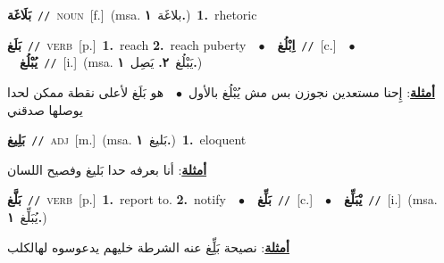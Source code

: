 \documentclass[10pt,a4paper,twoside]{article} %
\begin{document}
\begin{multicols}{2}
{\setlength\topsep{0pt}\textbf{\foreignlanguage{arabic}{بَلَاغَة}}\ {\color{gray}\texttt{//}\color{black}}\ \textsc{noun}\ [f.]\ \color{gray}(msa. \foreignlanguage{arabic}{بلاغَة}~\foreignlanguage{arabic}{\textbf{١.}})\color{black}\ \textbf{1.}~rhetoric\ } \vspace{2mm}

{\setlength\topsep{0pt}\textbf{\foreignlanguage{arabic}{بَلَغ}}\ {\color{gray}\texttt{//}\color{black}}\ \textsc{verb}\ [p.]\ \textbf{1.}~reach  \textbf{2.}~reach puberty\ \ $\bullet$\ \ \setlength\topsep{0pt}\textbf{\foreignlanguage{arabic}{اِبْلُغ}}\ {\color{gray}\texttt{//}\color{black}}\ [c.]\ \ $\bullet$\ \ \setlength\topsep{0pt}\textbf{\foreignlanguage{arabic}{يُبْلُغ}}\ {\color{gray}\texttt{//}\color{black}}\ [i.]\ \color{gray}(msa. \foreignlanguage{arabic}{يَبْلُغ}~\foreignlanguage{arabic}{\textbf{٢.}}  \foreignlanguage{arabic}{يَصِل}~\foreignlanguage{arabic}{\textbf{١.}})\color{black}\  \begin{flushright}\color{gray}\foreignlanguage{arabic}{\textbf{\underline{\foreignlanguage{arabic}{أمثلة}}}: إِحنا مستعدين نجوزن بس مش يُبْلُغ بالأول\ $\bullet$\ \  هو بَلَغ لأعلى نقطة ممكن لحدا يوصلها صدقني}\end{flushright}\color{black}} \vspace{2mm}

{\setlength\topsep{0pt}\textbf{\foreignlanguage{arabic}{بَلِيغ}}\ {\color{gray}\texttt{//}\color{black}}\ \textsc{adj}\ [m.]\ \color{gray}(msa. \foreignlanguage{arabic}{بَليغ}~\foreignlanguage{arabic}{\textbf{١.}})\color{black}\ \textbf{1.}~eloquent\  \begin{flushright}\color{gray}\foreignlanguage{arabic}{\textbf{\underline{\foreignlanguage{arabic}{أمثلة}}}: أنا بعرفه حدا بَليغ وفصيح اللسان}\end{flushright}\color{black}} \vspace{2mm}

{\setlength\topsep{0pt}\textbf{\foreignlanguage{arabic}{بَلَّغ}}\ {\color{gray}\texttt{//}\color{black}}\ \textsc{verb}\ [p.]\ \textbf{1.}~report to.  \textbf{2.}~notify\ \ $\bullet$\ \ \setlength\topsep{0pt}\textbf{\foreignlanguage{arabic}{بَلِّغ}}\ {\color{gray}\texttt{//}\color{black}}\ [c.]\ \ $\bullet$\ \ \setlength\topsep{0pt}\textbf{\foreignlanguage{arabic}{يْبَلِّغ}}\ {\color{gray}\texttt{//}\color{black}}\ [i.]\ \color{gray}(msa. \foreignlanguage{arabic}{يُبَلِّغ}~\foreignlanguage{arabic}{\textbf{١.}})\color{black}\  \begin{flushright}\color{gray}\foreignlanguage{arabic}{\textbf{\underline{\foreignlanguage{arabic}{أمثلة}}}: نصيحة بَلِِّغ عنه الشرطة خليهم يدعوسوه لهالكلب}\end{flushright}\color{black}} \vspace{2mm}


\end{multicols}
\end{document}
